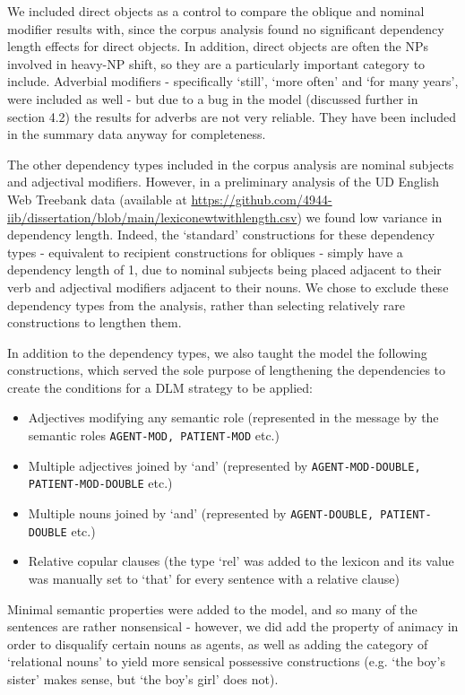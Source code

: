 \documentclass{article}
\begin{document}
We included direct objects as a control to compare the oblique and nominal modifier results with, since the corpus analysis found no significant dependency length effects for direct objects. In addition, direct objects are often the NPs involved in heavy-NP shift, so they are a particularly important category to include. Adverbial modifiers - specifically `still', `more often' and `for many years', were included as well - but due to a bug in the model (discussed further in section 4.2) the results for adverbs are not very reliable. They have been included in the summary data anyway for completeness.

The other dependency types included in the corpus analysis are nominal subjects and adjectival modifiers. However, in a preliminary analysis of the UD English Web Treebank data (available at \url{https://github.com/4944-iib/dissertation/blob/main/lexiconewtwithlength.csv}) we found low variance in dependency length. Indeed, the `standard' constructions for these dependency types - equivalent to recipient constructions for obliques - simply have a dependency length of 1, due to nominal subjects being placed adjacent to their verb and adjectival modifiers adjacent to their nouns. We chose to exclude these dependency types from the analysis, rather than selecting relatively rare constructions to lengthen them.

In addition to the dependency types, we also taught the model the following constructions, which served the sole purpose of lengthening the dependencies to create the conditions for a DLM strategy to be applied:
\begin{itemize}
	\item Adjectives modifying any semantic role (represented in the message by the semantic roles \texttt{AGENT-MOD, PATIENT-MOD} etc.)
	\item Multiple adjectives joined by `and' (represented by \texttt{AGENT-MOD-DOUBLE, PATIENT-MOD-DOUBLE} etc.)
	\item Multiple nouns joined by `and' (represented by \texttt{AGENT-DOUBLE, PATIENT-DOUBLE} etc.)
	\item Relative copular clauses (the type `rel' was added to the lexicon and its value was manually set to `that' for every sentence with a relative clause)
\end{itemize}

Minimal semantic properties were added to the model, and so many of the sentences are rather nonsensical - however, we did add the property of animacy in order to disqualify certain nouns as agents, as well as adding the category of `relational nouns' to yield more sensical possessive constructions (e.g. `the boy's sister' makes sense, but `the boy's girl' does not).
\end{document}
